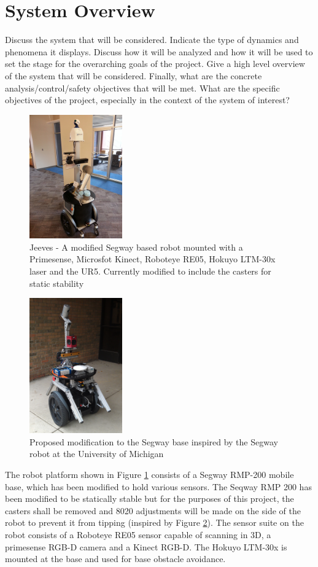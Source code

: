 \documentclass[journal]{IEEEtran}
\begin{document}
\section{System Overview}
Discuss the system that will be considered. Indicate the
type of dynamics and phenomena it displays. Discuss how it will be analyzed
and how it will be used to set the stage for the overarching goals of the project.
Give a high level overview
of the system that will be considered. Finally, what are the concrete analysis/control/safety
objectives that will be met.
What are the specific objectives of the project, especially in the
context of the system of interest?
\fi
\begin{figure}
    \centering
    \includegraphics[width = 4cm, scale=0.2]{jeeves2_0.jpg}
    \caption{Jeeves - A modified Segway based robot mounted with a Primesense, Microsfot Kinect, Roboteye RE05, Hokuyo LTM-30x laser and the UR5. Currently modified to include the casters for static stability}
    \label{fig:jeeves}
\end{figure}

\begin{figure}
    \centering
    \includegraphics[width = 4cm, scale=0.2]{segway1.jpg}
    \caption{Proposed modification to the Segway base inspired by the Segway robot at the University of Michigan}
    \label{fig:mod_jeeves}
\end{figure}


The robot platform shown in Figure \ref{fig:jeeves} consists of a Segway RMP-200 mobile base, which has been
modified to hold various sensors. The Seqway RMP 200 has been modified to be statically stable but for the purposes of this project, the casters shall be removed and 8020 adjustments will be made on the side of the robot to prevent it from tipping (inspired by Figure \ref{fig:mod_jeeves}). The sensor suite on the robot consists of a Roboteye RE05 sensor capable of scanning in 3D, a primesense RGB-D camera and a Kinect RGB-D. The Hokuyo LTM-30x is mounted at the base and used for base obstacle avoidance. 
\end{document}
